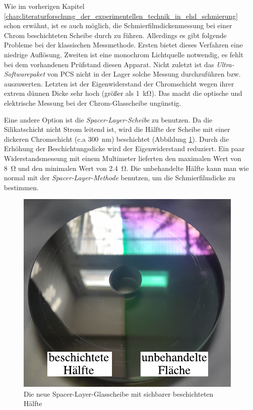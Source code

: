 Wie im vorherigen Kapitel \ref{chap:literaturforschung_der_experimentellen_technik_in_ehd_schmierung} schon erwähnt, ist es auch möglich, die Schmierfilmdickenmessung bei einer Chrom beschichteten Scheibe durch zu führen.
Allerdings es gibt folgende Probleme bei der klassischen Messmethode.
Ersten bietet dieses Verfahren eine niedrige Auflösung. Zweiten ist eine monochrom Lichtquelle notwendig, es fehlt bei dem vorhandenen Prüfstand diesen Apparat.
Nicht zuletzt ist das \textit{Ultra-Softwarepaket} von PCS nicht in der Lager solche Messung durchzuführen bzw. auszuwerten.
Letzten ist der Eigenwiderstand der Chromschicht wegen ihrer extrem dünnen Dicke sehr hoch (größer als \SI{1}{\kilo\ohm}).
\label{chap:literaturforschung_der_experimentellen_technik_in_ehd_schmierung}
Das macht die optische und elektrische Messung bei der Chrom-Glasscheibe ungünstig.

Eine andere Option ist die \textit{Spacer-Layer-Scheibe} zu benutzen.
Da die Silikatschicht nicht Strom leitend ist, wird die Hälfte der Scheibe mit einer dickeren Chromschicht (c.a \SI{300}{\nano\meter}) beschichtet (Abbildung \ref{fig:die_neu_beschichtet_glassscheibe}).
Durch die Erhöhung der Beschichtungsdicke wird der Eigenwiderstand reduziert.
Ein paar Widerstandsmessung mit einem Multimeter lieferten den maximalen Wert von \SI{8}{\ohm} und den minimalen Wert von \SI{2.4}{\ohm}.
Die unbehandelte Hälfte kann man wie normal mit der \textit{Spacer-Layer-Methode} benutzen, um die Schmierfilmdicke zu bestimmen.
\begin{figure}[htb]
    \centering
    \includegraphics[]{./images/beschichtete_scheibe.pdf}
    \caption{Die neue Spacer-Layer-Glasscheibe mit sichbarer beschichteten Hälfte}
    \label{fig:die_neu_beschichtet_glassscheibe}
\end{figure}
%

